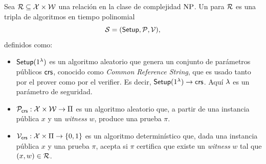 \begin{definition}[\SNARK, \zkSNARK]
\label{def:apendice-b-snark-snark-zksnark}
	Sea $\mathcal{R} \subseteq \mathcal{X} \times \mathcal{W}$ una relación en la clase de complejidad $\mathrm{NP}$. Un \SNARK para $\mathcal{R}$ es una tripla de algoritmos en tiempo polinomial
	$$\mathcal{S} = (\mathsf{Setup}, \mathcal{P}, \mathcal{V}),$$
	definidos como:
	\begin{itemize}
		\item $\mathsf{Setup}(1^\lambda)$ es un algoritmo aleatorio que genera un conjunto de parámetros públicos $\mathsf{crs}$, conocido como \textit{Common Reference String}, que es usado tanto por el prover como por el verifier. Es decir, $\mathsf{Setup}(1^\lambda) \to \mathsf{crs}$. Aquí $\lambda$ es un parámetro de seguridad.
		\item $\mathcal{P}_{\mathsf{crs}}: \mathcal{X} \times \mathcal{W} \to \Pi$ es un algoritmo aleatorio que, a partir de una instancia pública $x$ y un \textit{witness} $w$, produce una prueba $\pi$.
		\item $\mathcal{V}_{\mathsf{crs}}: \mathcal{X} \times \Pi \to \{0,1\}$ es un algoritmo determinístico que, dada una instancia pública $x$ y una prueba $\pi$, acepta si $\pi$ certifica que existe un \textit{witness} $w$ tal que $(x,w) \in \mathcal{R}$.
	\end{itemize}
	

\end{definition}
